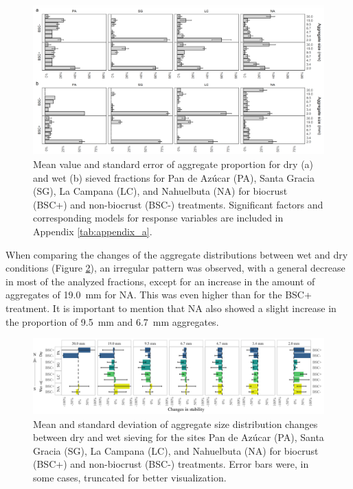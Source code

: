 \begin{figure}[H]
	\centering
	\includegraphics[width=1\textwidth]{img/M1-Figure_3.png}
	\caption[Value for aggregate proportion of dry and wet sieved fractions for the study sites for biocrust and non-biocrust treatments]{Mean value and standard error of aggregate proportion for dry (a) and wet (b) sieved fractions for Pan de Azúcar (PA), Santa Gracia (SG), La Campana (LC), and Nahuelbuta (NA) for biocrust (BSC+) and non-biocrust (BSC-) treatments. Significant factors and corresponding models for response variables are included in Appendix \ref{tab:appendix_a}.}
	\label{fig:M1-F3}
\end{figure}

\FloatBarrier

When comparing the changes of the aggregate distributions between wet and dry conditions (Figure \ref{fig:M1-F4}), an irregular pattern was observed, with a general decrease in most of the analyzed fractions, except for an increase in the amount of aggregates of \SI{19.0}{\milli\meter} for NA. This was even higher than for the BSC+ treatment. It is important to mention that NA also showed a slight increase in the proportion of \SI{9.5}{\milli\meter} and \SI{6.7}{\milli\meter} aggregates.

\begin{figure}[H]
	\centering
	\includegraphics[width=1\textwidth]{img/M1-Figure_4.png}
	\caption[Values of aggregate size distribution changes between dry and wet sieving for the study sites with biocrust and non-biocrust treatments]{Mean and standard deviation of aggregate size distribution changes between dry and wet sieving for the sites Pan de Azúcar (PA), Santa Gracia (SG), La Campana (LC), and Nahuelbuta (NA) for biocrust (BSC+) and non-biocrust (BSC-) treatments. Error bars were, in some cases, truncated for better visualization.}
	\label{fig:M1-F4}
\end{figure}

